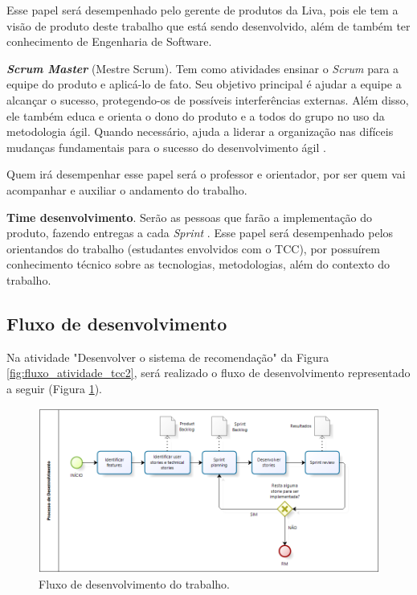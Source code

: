 Esse papel será desempenhado pelo gerente de produtos da Liva, pois ele tem a visão de produto deste trabalho que está sendo desenvolvido, além de também ter conhecimento de Engenharia de Software.

\textbf{\textit{Scrum Master}} (Mestre Scrum). Tem como atividades ensinar o \textit{Scrum} para a equipe do produto e aplicá-lo de fato. Seu objetivo principal é ajudar a equipe a alcançar o sucesso, protegendo-os de possíveis interferências externas. Além disso, ele também educa e  orienta o dono do produto e a todos do grupo no uso da metodologia ágil. Quando necessário, ajuda a liderar a organização nas difíceis mudanças fundamentais para o sucesso do desenvolvimento ágil \cite{Sutherland}.

Quem irá desempenhar esse papel será o professor e orientador, por ser quem vai acompanhar e auxiliar o andamento do trabalho.

\textbf{Time desenvolvimento}. Serão as pessoas que farão a implementação do produto, fazendo entregas a cada \textit{Sprint} \cite{Sutherland}. Esse papel será desempenhado pelos orientandos do trabalho (estudantes envolvidos com o TCC), por possuírem conhecimento técnico sobre as tecnologias, metodologias, além do contexto do trabalho.

\subsection{Fluxo de desenvolvimento}
\label{fluxo_desenvol}

Na atividade "Desenvolver o sistema de recomendação" da Figura \ref{fig:fluxo_atividade_tcc2}, será realizado o fluxo de desenvolvimento representado a seguir (Figura \ref{fig:fluxo_scrum}).

\begin{figure}[H]
    \centering
    \includegraphics[scale=0.6]{figuras/proposta/fluxo_scrum.png}
    \caption[Fluxo de desenvolvimento do trabalho]{Fluxo de desenvolvimento do trabalho.}
    \label{fig:fluxo_scrum}
\end{figure}

